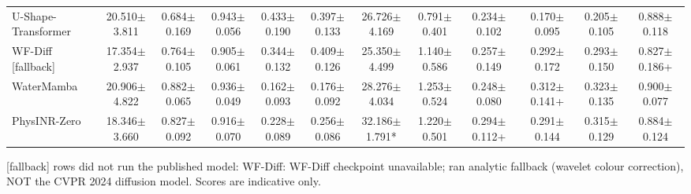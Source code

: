 \documentclass[journal]{IEEEtran}
\begin{document}
\begin{table}
{\begin{tabular}{lccccccccccc}
U-Shape-Transformer & 20.510$\pm$3.811 & 0.684$\pm$0.169 & 0.943$\pm$0.056 & 0.433$\pm$0.190 & 0.397$\pm$0.133 & 26.726$\pm$4.169 & 0.791$\pm$0.401 & 0.234$\pm$0.102 & 0.170$\pm$0.095 & 0.205$\pm$0.105 & 0.888$\pm$0.118 \\
WF-Diff [fallback] & 17.354$\pm$2.937 & 0.764$\pm$0.105 & 0.905$\pm$0.061 & 0.344$\pm$0.132 & 0.409$\pm$0.126 & 25.350$\pm$4.499 & 1.140$\pm$0.586 & 0.257$\pm$0.149 & 0.292$\pm$0.172 & 0.293$\pm$0.150 & 0.827$\pm$0.186+ \\
WaterMamba & 20.906$\pm$4.822 & 0.882$\pm$0.065 & 0.936$\pm$0.049 & 0.162$\pm$0.093 & 0.176$\pm$0.092 & 28.276$\pm$4.034 & 1.253$\pm$0.524 & 0.248$\pm$0.080 & 0.312$\pm$0.141+ & 0.323$\pm$0.135 & 0.900$\pm$0.077 \\
PhysINR-Zero & 18.346$\pm$3.660 & 0.827$\pm$0.092 & 0.916$\pm$0.070 & 0.228$\pm$0.089 & 0.256$\pm$0.086 & 32.186$\pm$1.791* & 1.220$\pm$0.501 & 0.294$\pm$0.112+ & 0.291$\pm$0.144 & 0.315$\pm$0.129 & 0.884$\pm$0.124 \\
\bottomrule
\end{tabular}
}
\par\smallskip\footnotesize [fallback] rows did not run the published model:
WF-Diff: WF-Diff checkpoint unavailable; ran analytic fallback (wavelet colour correction), NOT the CVPR 2024 diffusion model. Scores are indicative only.
\end{table}
\end{document}
